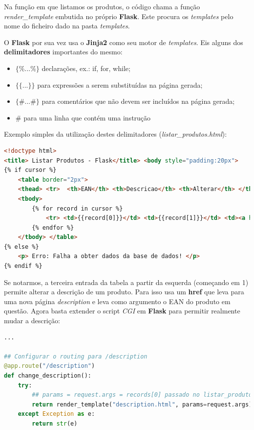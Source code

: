 \documentclass[oneside]{book}
\theoremstyle{definition}
\begin{document}
Na função em que listamos os produtos, o código chama a função \textit{render\_template} embutida no próprio \textbf{Flask}. Este procura os \textit{templates} pelo nome do ficheiro dado na pasta \textit{templates}.

O \textbf{Flask} por sua vez usa o \textbf{Jinja2} como seu motor de \textit{templates}. Eis alguns dos \textbf{delimitadores} importantes do mesmo:
\begin{itemize}
    \itemsep 0cm
    \item[--] $\{\% ... \%\}$ declarações, ex.: if, for, while;
    \item[--] $\{\{ ... \}\}$ para expressões a serem substituídas na página gerada;
    \item[--] $\{\# ... \#\}$ para comentários que não devem ser incluídos na página gerada;
    \item[--] $\#$ para uma linha que contém uma instrução
\end{itemize}

Exemplo simples da utilização destes delimitadores (\textit{listar\_produtos.html}):
\begin{lstlisting}[language=html, framesep=8pt, xleftmargin=40pt, framexleftmargin=40pt, frame=tb, framerule=0pt]
<!doctype html>
<title> Listar Produtos - Flask</title> <body style="padding:20px">
{% if cursor %}
    <table border="2px">
    <thead> <tr>  <th>EAN</th> <th>Descricao</th> <th>Alterar</th> </thead>
    <tbody>
        {% for record in cursor %}
            <tr> <td>{{record[0]}}</td> <td>{{record[1]}}</td> <td><a href="description?product_ean={{record[0]}}">Alterar Descricao</a> </td> </tr>
        {% endfor %}
    </tbody> </table>
{% else %}
    <p> Erro: Falha a obter dados da base de dados! </p>
{% endif %}
\end{lstlisting}

Se notarmos, a terceira entrada da tabela a partir da esquerda (começando em 1) permite alterar a descrição de um produto. Para isso usa um \textbf{href} que leva para uma nova página \textit{description} e leva como argumento o EAN do produto em questão. Agora basta extender o script \textit{CGI} em \textbf{Flask} para permitir realmente mudar a descrição:

\begin{lstlisting}[language=python, framesep=8pt, xleftmargin=40pt, framexleftmargin=40pt, frame=tb, framerule=0pt]
...

## Configurar o routing para /description
@app.route("/description")
def change_description():
    try:
        ## params = request.args = records[0] passado no listar_produtos.html
        return render_template("description.html", params=request.args)
    except Exception as e:
        return str(e)
\end{lstlisting}
\end{document}
